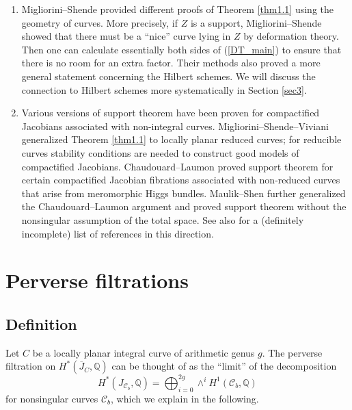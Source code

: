 \documentclass{pspum-l}
\theoremstyle{plain}
\theoremstyle{definition}
\theoremstyle{remark}
\newcommand{\BQ}{{\mathbb{Q}}}
\newcommand{\CC}{{\mathcal C}}
\begin{document}
\begin{enumerate}
    \item[(1)] Migliorini--Shende \cite{MS} provided different proofs of Theorem \ref{thm1.1} using the geometry of curves. More precisely, if $Z$ is a support, Migliorini--Shende showed that there must be a ``nice'' curve lying in $Z$ by deformation theory. Then one can calculate essentially both sides of (\ref{DT_main}) to ensure that there is no room for an extra factor. Their methods also proved a more general statement concerning the Hilbert schemes. We will discuss the connection to Hilbert schemes more systematically in Section \ref{sec3}.

    \item[(2)] Various versions of support theorem have been proven for compactified Jacobians associated with non-integral curves. Migliorini--Shende--Viviani \cite{MSV} generalized Theorem \ref{thm1.1} to locally planar reduced curves; for reducible curves stability conditions are needed to construct good models of compactified Jacobians. Chaudouard--Laumon \cite{CL} proved support theorem for certain compactified Jacobian fibrations associated with non-reduced curves that arise from meromorphic Higgs bundles. Maulik--Shen \cite{MS_chi} further generalized the Chaudouard--Laumon argument and proved support theorem without the nonsingular assumption of the total space. See also \cite{dCHeM, MM, MMP} for a (definitely incomplete) list of references in this direction.
\end{enumerate}















\section{Perverse filtrations}\label{sec2}



\subsection{Definition}\label{sec2.1}


Let $C$ be a locally planar integral curve of arithmetic genus $g$. The perverse filtration on $H^*(\overline{J}_{C}, \BQ)$ can be thought of as the ``limit'' of the decomposition
\begin{equation}\label{decomp1}
H^*({J}_{\CC_b}, \BQ) = \bigoplus_{i=0}^{2g} \wedge^i H^1(\CC_b, \BQ)
\end{equation}
for nonsingular curves $\CC_b$, which we explain in the following.
\end{document}
